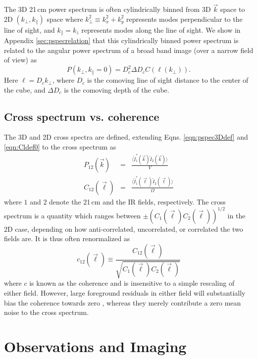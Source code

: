 \documentclass{emulateapj}
\begin{document}
The 3D 21\,cm power spectrum is often cylindrically binned from 3D $\vec{k}$ space to 2D $(k_\perp,k_\parallel)$ space where $k_\perp^2\equiv k_x^2+k_y^2$ represents modes perpendicular to the line of sight, and $k_\parallel=k_z$ represents modes along the line of sight. We show in Appendix \ref{sec:pspecrelation} that this cylindrically binned power spectrum is related to the angular power spectrum of a broad band image (over a narrow field of view) as
\begin{equation}
P(k_\perp,k_\parallel=0)=D_c^2 \Delta D_c C(\ell(k_\perp)).
\end{equation}
Here $\ell=D_c k_\perp$, where $D_c$ is the comoving line of sight distance to the center of the cube, and $\Delta D_c$ is the comoving depth of the cube.

\subsection{Cross spectrum vs. coherence}

The 3D and 2D cross spectra are defined, extending Eqns. \ref{eqn:pspec3Ddef} and \ref{eqn:Cldef0} to the cross spectrum as
\begin{eqnarray}
	P_{12}(\vec{k}) &=& \frac{\langle\tilde{I}_1^*(\vec{k})\tilde{I}_2(\vec{k})\rangle}{V}\\
	C_{12}(\vec{\ell}) &=& \frac{\langle \tilde{I}_1^*(\vec{\ell})\tilde{I}_2(\vec{\ell})\rangle}{\Omega}
\end{eqnarray}
where $1$ and $2$ denote the 21\,cm and the IR fields, respectively. The cross spectrum is a quantity which ranges between $\pm(C_{1}(\vec{\ell})C_{2}(\vec{\ell}))^{1/2}$ in the 2D case, depending on how anti-correlated, uncorrelated, or correlated the two fields are. It is thus often renormalized as  
\begin{equation}
\label{eqn:Cldefcross}
	c_{12}(\vec{\ell}) \equiv \frac{C_{12}(\vec{\ell}) }{\sqrt{C_1(\vec{\ell})  C_2(\vec{\ell}) }}
\end{equation}
where $c$ is known as the coherence and is insensitive to a simple rescaling of either field. However, large foreground residuals in either field will substantially bias the coherence towards zero \citep{lidz09,furlanettolidz07}, whereas they merely contribute a zero mean noise to the cross spectrum. 

\section{Observations and Imaging}
\end{document}

